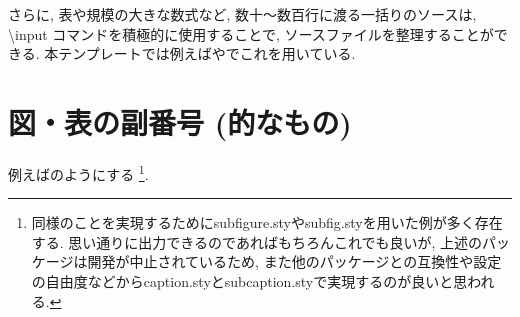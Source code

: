 さらに, 表や規模の大きな数式など, 数十〜数百行に渡る一括りのソースは, \textbackslash input コマンドを積極的に使用することで, ソースファイルを整理することができる. 本テンプレートでは例えばやでこれを用いている. 


\section{図・表の副番号 (的なもの)}
例えばのようにする
\footnote{同様のことを実現するためにsubfigure.styやsubfig.styを用いた例が多く存在する. 思い通りに出力できるのであればもちろんこれでも良いが, 上述のパッケージは開発が中止されているため, また他のパッケージとの互換性や設定の自由度などからcaption.styとsubcaption.styで実現するのが良いと思われる. }. 

